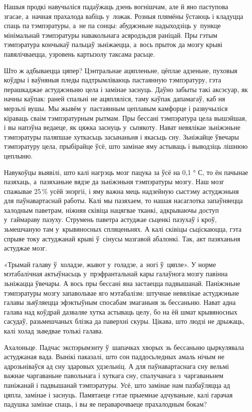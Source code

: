 Нашыя продкі навучыліся падаўжаць дзень вогнішчам, але й яно паступова згасае, а~начная прахалода вабіць у~ложак. Розныя плямёны ўстаюць і кладуцца спаць па тэмпэратуры, а~не па сонцы: абуджэньне надыходзіць у~пункце мінімальнай тэмпэратуры навакольнага асяродзьдзя раніцай. Пры гэтым тэмпэратура кончыкаў пальцаў зьніжаецца, а~вось прыток да мозгу крыві павялічваецца, узровень картызолу таксама расьце.

Што ж адбываецца цяпер? Цэнтральнае ацяпленьне, цёплае адзеньне, пуховыя коўдры і ваўняныя пледы падтрымліваюць пастаянную тэмпэратуру, гэта перашкаджае астуджэньню цела і замінае заснуць. Даўно забыты такі аксэсуар, як начны каўпак: раней спальні не ацяпляліся, таму каўпак дапамагаў, каб ня мерзьлі вушы. Мы жывём у~пастаянным цеплавым камфорце і развучыліся кіраваць сваім тэмпэратурным рытмам. Пры бессані тэмпэратура цела вышэйшая, і вы напэўна ведаеце, як цяжка заснуць у~сьпякоту. Нават невялікае зьніжэньне тэмпэратуры паляпшае хуткасьць засынаньня і якасьць сну. Зьніжайце ўвечары тэмпэратуру цела, прыбірайце ўсё, што замінае яму астываць і выводзіць лішнюю цеплыню.

Навукоўцы выявілі, што калі нагрэць мозг пацука за ўсё на 0,1 ° С, то ён пачынае пазяхаць, а~пазяханьне вядзе да зьніжэньня тэмпэратуры мозгу. Наш мозг спажывае 25\,\% усёй энэргіі, і яму важна мець надзейную сыстэму астуджэньня для паўнавартаснай работы. Калі мы пазяхаем, то нашая насаглотка запаўняецца халодным паветрам, ніжняя сківіца нацягвае тканкі, адкрываючы доступ у~гаймараву пазуху. Струмень паветра астуджае сьценкі пазухаў і кроў, зьмешчаную там у~крывяносных спляценьнях. А калі сківіцы сьціскаюцца, гэта спрыяе току астуджанай крыві ў~сінусы мазгавой абалонкі. Так, акт пазяханьня астуджае мозг.

«Трымай галаву ў~холадзе, жывот у~голадзе, а~ногі ў~цяпле». У норме мэтабалічная актыўнасьць у~прэфрантальнай кары галаўнога мозгу павінна зьніжацца ўвечары. А вось пры бессані яна застаецца падвышанай. Паніжэньне тэмпэратуры мозгу запавольвае яго мэтабалізм: штучнае невялікае астуджэньне галавы зьяўляецца эфэктыўным спосабам змаганьня зь бессаньню. Нават адна галава над коўдрай дазваляе хутка астываць целу, бо на ёй шмат крывяносных сасудаў, разьмешчаных блізка да паверхні скуры. Цікава, што людзі не дрыжаць, калі холад зьведвае толькі галава.

Ахалоньце. Падчас экспэрымэнту ў~шапачках хворых зь бессаньню цыркулявала астуджаная вада. Вынікі паказалі, што сон паддосьледных амаль нічым не адрозьніваўся ад сну здаровых удзельніц. А для паўнавартаснага сну вельмі важнае чаргаваньне павольнага і хуткага сну, спалучанага з~чаргаваньнем паніжанай і падвышанай тэмпэратуры. Усё, што замінае нам пазбаўляцца ад цяпла, замінае і заснуць. Памятаеце гэтае прыемнае адчуваньне, калі гарачая падушка замінае спаць, і вы яе пераварочваеце прахалодным бокам?


